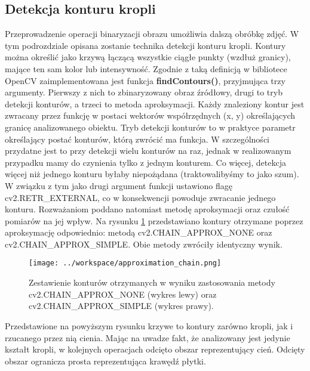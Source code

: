 \documentclass[a4paper,11pt,twoside,openright]{article} %
\begin{document}
\subsection{Detekcja konturu kropli} 
\label{chapter:contour_detection}
\noindent Przeprowadzenie operacji binaryzacji obrazu umożliwia dalszą obróbkę zdjęć. W tym podrozdziale opisana zostanie technika detekcji konturu kropli. Kontury można określić jako krzywą łączącą wszystkie ciągłe punkty (wzdłuż granicy), mające ten sam kolor lub intensywność. Zgodnie z taką definicją w bibliotece OpenCV zaimplementowana jest funkcja \textbf{findContours()}, przyjmująca trzy argumenty. Pierwszy z nich to zbinaryzowany obraz źródłowy, drugi to tryb detekcji konturów, a trzeci to metoda aproksymacji. Każdy znaleziony kontur jest zwracany przez funkcję w postaci wektorów współrzędnych (x, y) określających granicę analizowanego obiektu. Tryb detekcji konturów to w praktyce parametr określający postać konturów, którą zwrócić ma funkcja. W szczególności przydatne jest to przy detekcji wielu konturów na raz, jednak w realizowanym przypadku mamy do czynienia tylko z jednym konturem. Co więcej, detekcja więcej niż jednego konturu byłaby niepożądana (traktowalibyśmy to jako szum). W związku z tym jako drugi argument funkcji ustawiono flagę cv2.RETR\_EXTERNAL, co w konsekwencji powoduje zwracanie jednego konturu. Rozważaniom poddano natomiast metodę aproksymacji oraz czułość pomiarów na jej wpływ. Na rysunku \ref{fig:approx_method} przedstawiano kontury otrzymane poprzez aproksymację odpowiednio: metodą cv2.CHAIN\_APPROX\_NONE oraz \\cv2.CHAIN\_APPROX\_SIMPLE. Obie metody zwróciły identyczny wynik.

\captionsetup{skip=0pt}
\begin{figure}[!h]
\captionsetup{justification=centering}
\begin{center}
\texttt{[image: ../workspace/approximation\_chain.png]} 
\end{center}
\caption{Zestawienie konturów otrzymanych w wyniku zastosowania metody\\cv2.CHAIN\_APPROX\_NONE (wykres lewy) oraz cv2.CHAIN\_APPROX\_SIMPLE (wykres prawy).}
\label{fig:approx_method}
\end{figure} 

\noindent Przedstawione na powyższym rysunku krzywe to kontury zarówno kropli, jak i rzucanego przez nią cienia. Mając na uwadze fakt, że analizowany jest jedynie kształt kropli, w kolejnych operacjach odcięto obszar reprezentujący cień. Odcięty obszar ogranicza prosta reprezentująca krawędź płytki.
\end{document}
